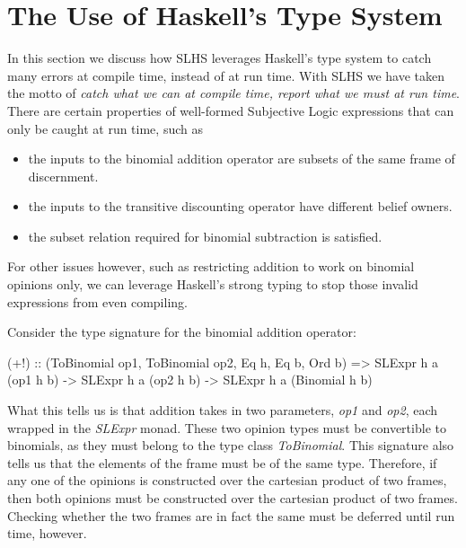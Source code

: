 \documentclass[thesis.tex]{subfiles}
\begin{document}
%
%





\section{The Use of Haskell's Type System}
\label{sec:types}

In this section we discuss how SLHS leverages Haskell's type system to catch many errors
at compile time, instead of at run time. With SLHS we have taken the motto of \emph{catch what we
can at compile time, report what we must at run time}. There are certain properties of well-formed
Subjective Logic expressions that can only be caught at run time, such as

\begin{itemize}
  \item the inputs to the binomial addition operator are subsets of the same frame
    of discernment.
  \item the inputs to the transitive discounting operator have different belief
    owners.
  \item the subset relation required for binomial subtraction is satisfied.
\end{itemize}

For other issues however, such as restricting addition to work on binomial opinions only, we can
leverage Haskell's strong typing to stop those invalid expressions from even compiling.

Consider the type signature for the binomial addition operator:

\begin{spec}
(+!) :: (ToBinomial op1, ToBinomial op2, Eq h, Eq b, Ord b)
        => SLExpr h a (op1 h b)
        -> SLExpr h a (op2 h b)
        -> SLExpr h a (Binomial h b)
\end{spec}

What this tells us is that addition takes in two parameters, \emph{op1} and \emph{op2}, each wrapped in
the \emph{SLExpr} monad. These two opinion types must be convertible to binomials, as they must belong to
the type class \emph{ToBinomial}. This signature also tells us that the elements of the frame must be of
the same type. Therefore, if any one of the opinions is constructed over the cartesian product of two frames,
then both opinions must be constructed over the cartesian product of two frames. Checking whether the two
frames are in fact the same must be deferred until run time, however.
\end{document}
